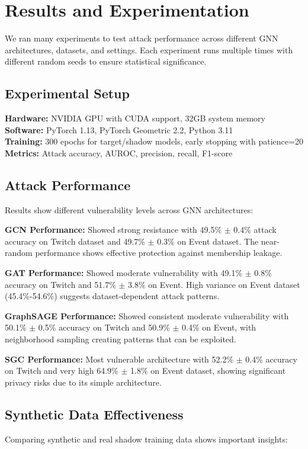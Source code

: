 \documentclass{article}
\begin{document}
\section{Results and Experimentation}
\label{results}
We ran many experiments to test attack performance across different GNN architectures, datasets, and settings. Each experiment runs multiple times with different random seeds to ensure statistical significance.

\subsection{Experimental Setup}
\textbf{Hardware:} NVIDIA GPU with CUDA support, 32GB system memory\\
\textbf{Software:} PyTorch 1.13, PyTorch Geometric 2.2, Python 3.11\\
\textbf{Training:} 300 epochs for target/shadow models, early stopping with patience=20\\
\textbf{Metrics:} Attack accuracy, AUROC, precision, recall, F1-score

\subsection{Attack Performance}
Results show different vulnerability levels across GNN architectures:

\textbf{GCN Performance:} Showed strong resistance with 49.5\% $\pm$ 0.4\% attack accuracy on Twitch dataset and 49.7\% $\pm$ 0.3\% on Event dataset. The near-random performance shows effective protection against membership leakage.

\textbf{GAT Performance:} Showed moderate vulnerability with 49.1\% $\pm$ 0.8\% accuracy on Twitch and 51.7\% $\pm$ 3.8\% on Event. High variance on Event dataset (45.4\%-54.6\%) suggests dataset-dependent attack patterns.

\textbf{GraphSAGE Performance:} Showed consistent moderate vulnerability with 50.1\% $\pm$ 0.5\% accuracy on Twitch and 50.9\% $\pm$ 0.4\% on Event, with neighborhood sampling creating patterns that can be exploited.

\textbf{SGC Performance:} Most vulnerable architecture with 52.2\% $\pm$ 0.4\% accuracy on Twitch and very high 64.9\% $\pm$ 1.8\% on Event dataset, showing significant privacy risks due to its simple architecture.

\subsection{Synthetic Data Effectiveness}
Comparing synthetic and real shadow training data shows important insights:
\end{document}
